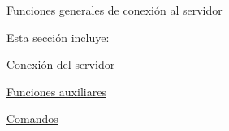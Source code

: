 Funciones generales de conexión al servidor

Esta sección incluye\+:
\begin{DoxyItemize}
\item \hyperlink{server_connection}{Conexión del servidor}
\item \hyperlink{server_common_functions}{Funciones auxiliares}
\item \hyperlink{server_commands}{Comandos} 
\end{DoxyItemize}
